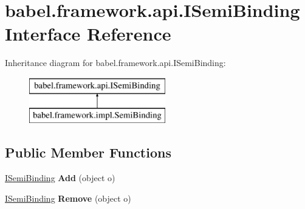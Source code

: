 \hypertarget{interfacebabel_1_1framework_1_1api_1_1_i_semi_binding}{\section{babel.\-framework.\-api.\-I\-Semi\-Binding Interface Reference}
\label{interfacebabel_1_1framework_1_1api_1_1_i_semi_binding}
}
Inheritance diagram for babel.\-framework.\-api.\-I\-Semi\-Binding\-:\begin{figure}[H]
\begin{center}
\leavevmode
\includegraphics[height=2.000000cm]{interfacebabel_1_1framework_1_1api_1_1_i_semi_binding}
\end{center}
\end{figure}
\subsection*{Public Member Functions}
\begin{DoxyCompactItemize}
\item 
\hypertarget{interfacebabel_1_1framework_1_1api_1_1_i_semi_binding_a28862ccfc8dea081b50f37566862bc3a}{\hyperlink{interfacebabel_1_1framework_1_1api_1_1_i_semi_binding}{I\-Semi\-Binding} {\bfseries Add} (object o)}\label{interfacebabel_1_1framework_1_1api_1_1_i_semi_binding_a28862ccfc8dea081b50f37566862bc3a}

\item 
\hypertarget{interfacebabel_1_1framework_1_1api_1_1_i_semi_binding_a56463330c22aacd84eda4c0492e053fc}{\hyperlink{interfacebabel_1_1framework_1_1api_1_1_i_semi_binding}{I\-Semi\-Binding} {\bfseries Remove} (object o)}\label{interfacebabel_1_1framework_1_1api_1_1_i_semi_binding_a56463330c22aacd84eda4c0492e053fc}

\end{DoxyCompactItemize}
